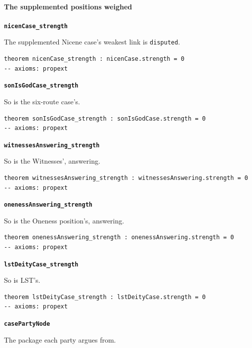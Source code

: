 \documentclass[11pt,paper=\testimonypaper,DIV=13,parskip=false]{scrartcl}
\begin{document}
\paragraph*{The supplemented positions weighed}
\leavevmode\par\nobreak
\par\medskip\noindent\textbf{\texttt{nicen\allowbreak{}Case\_\allowbreak{}strength}}\par\nobreak\noindent
The supplemented Nicene case’s weakest link is \texttt{disputed}.

{\small\begin{verbatim}
theorem nicenCase_strength : nicenCase.strength = 0
-- axioms: propext
\end{verbatim}}
\par\medskip\noindent\textbf{\texttt{son\allowbreak{}Is\allowbreak{}God\allowbreak{}Case\_\allowbreak{}strength}}\par\nobreak\noindent
So is the six-route case’s.

{\small\begin{verbatim}
theorem sonIsGodCase_strength : sonIsGodCase.strength = 0
-- axioms: propext
\end{verbatim}}
\par\medskip\noindent\textbf{\texttt{witnesses\allowbreak{}Answering\_\allowbreak{}strength}}\par\nobreak\noindent
So is the Witnesses’, answering.

{\small\begin{verbatim}
theorem witnessesAnswering_strength : witnessesAnswering.strength = 0
-- axioms: propext
\end{verbatim}}
\par\medskip\noindent\textbf{\texttt{oneness\allowbreak{}Answering\_\allowbreak{}strength}}\par\nobreak\noindent
So is the Oneness position’s, answering.

{\small\begin{verbatim}
theorem onenessAnswering_strength : onenessAnswering.strength = 0
-- axioms: propext
\end{verbatim}}
\par\medskip\noindent\textbf{\texttt{lst\allowbreak{}Deity\allowbreak{}Case\_\allowbreak{}strength}}\par\nobreak\noindent
So is LST’s.

{\small\begin{verbatim}
theorem lstDeityCase_strength : lstDeityCase.strength = 0
-- axioms: propext
\end{verbatim}}
\par\medskip\noindent\textbf{\texttt{case\allowbreak{}Party\allowbreak{}Node}}\par\nobreak\noindent
The package each party argues from.
\end{document}
